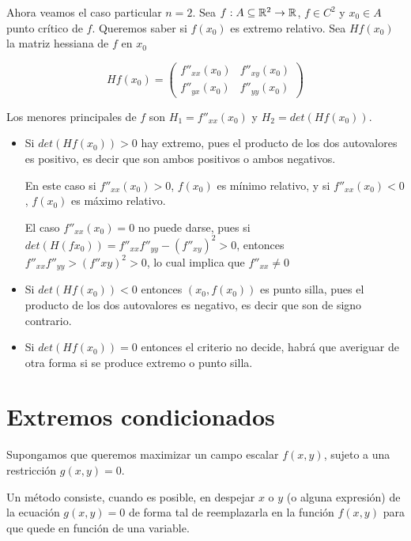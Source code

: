 \begin{example}
Ahora veamos el caso particular $n=2$.  Sea $f : A \subseteq \mathbb{R}^2 \to \mathbb{R}$, $f \in C^2$ y $x_0 \in A$ punto crítico de $f$.  Queremos saber si $f(x_0)$ es extremo relativo. Sea $Hf(x_0)$ la matriz hessiana de $f$ en $x_0$

$$ Hf(x_0) = \begin{pmatrix} f''_{xx}(x_0) & f''_{xy}(x_0) \\ f''_{yx}(x_0) & f''_{yy}(x_0)  \end{pmatrix} $$

Los menores principales de $f$ son $ H_1 = f''_{xx}(x_0) $ y $ H_2 = det(Hf(x_0)) $.

\begin{itemize}
\item Si $det(Hf(x_0)) > 0$ hay extremo, pues el producto de los dos autovalores es positivo, es decir que son ambos positivos o ambos negativos.  

En este caso si $f''_{xx}(x_0) > 0$, $f(x_0)$ es mínimo relativo, y si $f''_{xx}(x_0) < 0$, $f(x_0)$ es máximo relativo.  

El caso $f''_{xx}(x_0) = 0$ no puede darse, pues si $det(H(fx_0)) = f''_{xx}f''_{yy} - (f''_{xy})^2 > 0$, entonces $f''_{xx}f''_{yy} > (f''{xy})^2 > 0$, lo cual implica que $f''_{xx} \neq 0$

\item Si $det(Hf(x_0)) < 0$ entonces $(x_0, f(x_0))$ es punto silla, pues el producto de los dos autovalores es negativo, es decir que son de signo contrario.

\item Si $det(Hf(x_0)) = 0$ entonces el criterio no decide, habrá que averiguar de otra forma si se produce extremo o punto silla.
\end{itemize}

\end{example}

\section{Extremos condicionados}

Supongamos que queremos maximizar un campo escalar $f(x,y)$, sujeto a una restricción $g(x,y) = 0$.

Un método consiste, cuando es posible, en despejar $x$ o $y$ (o alguna expresión) de la ecuación $g(x,y) = 0$ de forma tal de reemplazarla en la función $ f(x,y)$ para que quede en función de una variable.

